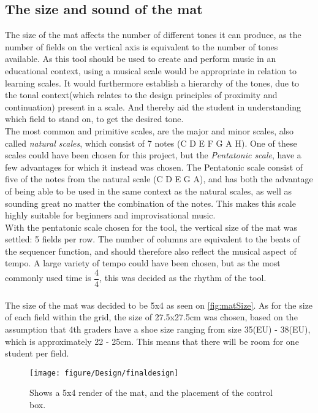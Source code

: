 \subsection{The size and sound of the mat } \label{sizeSoundColorMat}
The size of the mat affects the number of different tones it can produce, as the number of fields on the vertical axis is equivalent to the number of tones available. As this tool should be used to create and perform music in an educational context, using a musical scale would be appropriate in relation to learning scales. It would furthermore establish a hierarchy of the tones, due to the tonal context(which relates to the design principles of proximity and continuation\cite{gestalt}) present in a scale\cite{cognitiveFoundationOfPitch}. And thereby aid the student in understanding which field to stand on, to get the desired tone. \\
The most common and primitive scales, are the major and minor scales, also called \textit{natural scales}, which consist of 7 notes (C D E F G A H)\cite{scales}. One of these scales could have been chosen for this project, but the \textit{Pentatonic scale}, have a few advantages for which it instead was chosen. The Pentatonic scale consist of five of the notes from the natural scale (C D E G A), and has both the advantage of being able to be used in the same context as the natural scales, as well as sounding great no matter the combination of the notes\cite{pentatonicScale}. This makes this scale highly suitable for beginners and improvisational music\cite{pentatonicScale}.\\ 

With the pentatonic scale chosen for the tool, the vertical size of the mat was settled: 5 fields per row. The number of columns are equivalent to the beats of the sequencer function, and should therefore also reflect the musical aspect of tempo. A large variety of tempo could have been chosen, but as the most commonly used time is $\dfrac{4}{4} $\cite{tempo}, this was decided as the rhythm of the tool.\\\\
The size of the mat was decided to be 5x4 as seen on \autoref{fig:matSize}. As for the size of each field within the grid, the size of 27.5x27.5cm was chosen, based on the assumption that 4th graders have a shoe size ranging from size 35(EU) - 38(EU), which is approximately 22 - 25cm. This means that there will be room for one student per field.

\begin{figure}[H]
	\centering
	\texttt{[image: figure/Design/finaldesign]}
	\caption{Shows a 5x4 render of the mat, and the placement of the control box.}
	\label{fig:matSize}
\end{figure}

